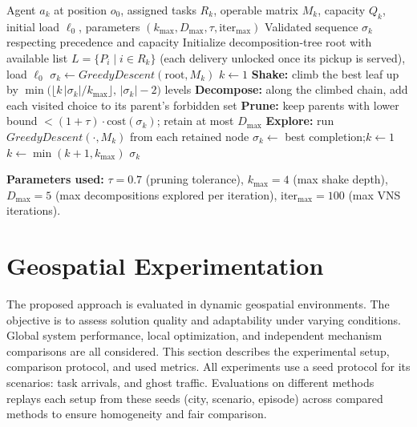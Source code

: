 \documentclass[sigconf]{acmart}
\begin{document}
\begin{algorithm}[!htbp]
\caption{DbVNS-Single Agent PDP}
\label{alg:dbvns-pdp}
\begin{algorithmic}[1]
\REQUIRE Agent $a_k$ at position $o_0$, assigned tasks $R_k$, operable matrix $M_k$,
         capacity $Q_k$, initial load $\ell_0$, parameters
         $(k_{\max}, D_{\max}, \tau, \text{iter}_{\max})$
\ENSURE Validated sequence $\sigma_k$ respecting precedence and capacity
\STATE Initialize decomposition-tree root with available list
       $L = \{P_i \mid i \in R_k\}$ (each delivery unlocked once its pickup is served), load $\ell_0$
\STATE $\sigma_k \gets \textit{GreedyDescent}(\text{root}, M_k)$
       \hfill{}
\STATE $k \gets 1$
    \STATE \textbf{Shake:} climb the best leaf up by $\min\!\bigl(\lfloor k\,|\sigma_k|/k_{\max}\rfloor,\, |\sigma_k|-2\bigr)$ levels
    \STATE \textbf{Decompose:} along the climbed chain, add each visited choice to its parent's forbidden set
    \STATE \textbf{Prune:} keep parents with lower bound $< (1+\tau)\cdot \mathrm{cost}(\sigma_k)$; retain at most $D_{\max}$
    \STATE \textbf{Explore:} run $\textit{GreedyDescent}(\cdot, M_k)$ from each retained node
        \STATE $\sigma_k \gets$ best completion;\quad $k \gets 1$
    \ELSE
        \STATE $k \gets \min(k + 1, k_{\max})$
    \ENDIF
\ENDFOR
\RETURN $\sigma_k$
\end{algorithmic}
\medskip
\footnotesize
\textbf{Parameters used:}
$\tau = 0.7$ (pruning tolerance),
$k_{\max} = 4$ (max shake depth),
$D_{\max} = 5$ (max decompositions explored per iteration),
$\text{iter}_{\max} = 100$ (max VNS iterations).
\end{algorithm}
 
\section{Geospatial Experimentation}
\label{sec:experimentation}

The proposed approach is evaluated in dynamic geospatial environments. The objective is to assess solution quality and adaptability under varying conditions. Global system performance, local optimization, and independent mechanism comparisons are all considered. This section describes the experimental setup, comparison protocol, and used metrics. All experiments use a seed protocol for its scenarios: task arrivals, and ghost traffic. Evaluations on different methods replays each setup from these seeds (city, scenario, episode) across compared methods to ensure homogeneity and fair comparison.
\end{document}
